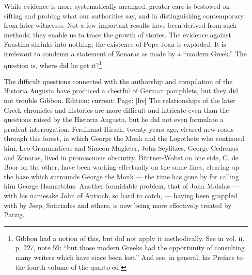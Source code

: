 While evidence is more systematically arranged, greater care is bestowed on sifting and probing what our authorities say, and in distinguishing contemporary from later witnesses. Not a few important results have been derived from such methods; they enable us to trace the growth of stories. The evidence against Faustina shrinks into nothing; the existence of Pope Joan is exploded. It is irrelevant to condemn a statement of Zonaras as made by a \texthebrew{“}modern Greek.\texthebrew{}” The question is, where did he get it?\footnote{Gibbon had a notion of this, but did not apply it methodically. See in vol. ii. p. 227, note 59: \texthebrew{“}but those modern Greeks had the opportunity of consulting many writers which have since been lost.\texthebrew{}” And see, in general, his Preface to the fourth volume of the quarto ed.}

The difficult questions connected with the authorship and compilation of the Historia Augusta have produced a chestful of German pamphlets, but they did not trouble Gibbon. Edition: current; Page: [liv] The relationships of the later Greek chronicles and histories are more difficult and intricate even than the questions raised by the Historia Augusta, but he did not even formulate a prudent interrogation. Ferdinand Hirsch, twenty years ago, cleared new roads through this forest, in which George the Monk and the Logothete who continued him, Leo Grammaticus and Simeon Magister, John Scylitzes, George Cedrenus and Zonaras, lived in promiscuous obscurity. Büttner-Wobst on one side, C. de Boor on the other, have been working effectually on the same lines, clearing up the haze which surrounds George the Monk \texthebrew{—} the time has gone by for calling him George Hamartolus. Another formidable problem, that of John Malalas \texthebrew{—} with his namesake John of Antioch, so hard to catch, \texthebrew{—} having been grappled with by Jeep, Sotiriades and others, is now being more effectively treated by Patzig.

